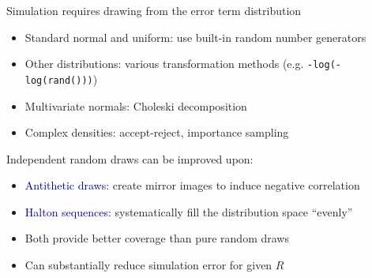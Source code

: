 \documentclass[aspectratio=169]{beamer}
\begin{document}
\begin{frame}

Simulation requires drawing from the error term distribution

\bigskip

\begin{itemize}
\itemsep1.5em
\item<2-> Standard normal and uniform: use built-in random number generators
\item<3-> Other distributions: various transformation methods (e.g. \texttt{-log(-log(rand()))})
\item<4-> Multivariate normals: Choleski decomposition
\item<5-> Complex densities: accept-reject, importance sampling
\end{itemize}

\end{frame}

\begin{frame}

Independent random draws can be improved upon:

\bigskip

\begin{itemize}
\itemsep1.5em
\item<2-> \textcolor{navy}{Antithetic draws}: create mirror images to induce negative correlation
\item<3-> \textcolor{navy}{Halton sequences}: systematically fill the distribution space ``evenly'' 
\item<4-> Both provide better coverage than pure random draws
\item<5-> Can substantially reduce simulation error for given $R$
\end{itemize}


\end{frame}



\begin{frame}
\centering
{}
\end{frame}
\end{document}
